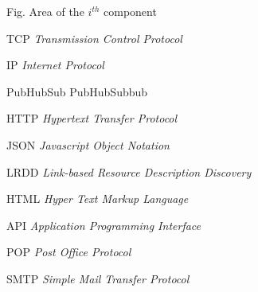 \begin{siglas}
  \item[Fig.] Area of the $i^{th}$ component
  \item[TCP] \textit{Transmission Control Protocol}
  \item[IP] \textit{Internet Protocol}
  \item[PubHubSub] PubHubSubbub
  \item[HTTP] \textit{Hypertext Transfer Protocol}
  \item[JSON] \textit{Javascript Object Notation}
  \item[LRDD] \textit{Link-based Resource Description Discovery}
  \item[HTML] \textit{Hyper Text Markup Language}
  \item[API] \textit{Application Programming Interface}
  \item[POP] \textit{Post Office Protocol}
  \item[SMTP] \textit{Simple Mail Transfer Protocol}
\end{siglas}
